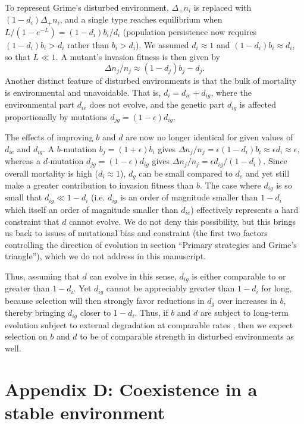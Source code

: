 \documentclass[11pt]{article}
\begin{document}
To represent Grime's disturbed environment, $\Delta_+ n_i$ is replaced with $(1-d_i)\Delta_+ n_i$, and a single type reaches equilibrium when $L/(1-e^{-L})=(1-d_i)b_i/d_i$ (population persistence now requires $(1-d_i)b_i>d_i$ rather than $b_i>d_i$). We assumed $d_i\approx 1$ and $(1-d_i)b_i\approx d_i$, so that $L\ll 1$. A mutant's invasion fitness is then given by
\begin{equation}
\Delta n_j/n_j \approx (1-d_j)b_j - d_j.
\end{equation}
Another distinct feature of disturbed environments is that the bulk of mortality is environmental and unavoidable. That is, $d_i=d_{ie}+d_{ig}$, where the environmental part $d_{ie}$ does not evolve, and the genetic part $d_{ig}$ is affected proportionally by mutations $d_{jg}=(1-\epsilon) d_{ig}$.

The effects of improving $b$ and $d$ are now no longer identical for given values of $d_{ie}$ and $d_{ig}$. A $b$-mutation $b_j=(1+\epsilon)b_i$ gives $\Delta n_j/n_j = \epsilon (1-d_i)b_i\approx \epsilon d_i \approx \epsilon$, whereas a $d$-mutation $d_{jg}=(1-\epsilon) d_{ig}$ gives $\Delta n_j/n_j = \epsilon d_{ig}/(1-d_i)$. Since overall mortality is high ($d_i\approx 1$), $d_{g}$ can be small compared to $d_{e}$ and yet still make a greater contribution to invasion fitness than $b$. The case where $d_{ig}$ is so small that $d_{ig}\ll 1-d_i$ (i.e. $d_{ig}$ is an order of magnitude smaller than $1-d_i$ which itself an order of magnitude smaller than $d_{ie}$) effectively represents a hard constraint that $d$ cannot evolve. We do not deny this possibility, but this brings us back to issues of mutational bias and constraint (the first two factors controlling the direction of evolution in section ``Primary strategies and Grime's triangle''), which we do not address in this manuscript. 

Thus, assuming that $d$ can evolve in this sense, $d_{ig}$ is either comparable to or greater than $1-d_i$. Yet $d_{ig}$ cannot be appreciably greater than $1-d_i$ for long, because selection will then strongly favor reductions in $d_g$ over increases in $b$, thereby bringing $d_{ig}$ closer to $1-d_i$. Thus, if $b$ and $d$ are subject to long-term evolution subject to external degradation at comparable rates \citep{bertram_2017}, then we expect selection on $b$ and $d$ to be of comparable strength in disturbed environments as well.

\section*{Appendix D: Coexistence in a stable environment}
\end{document}

